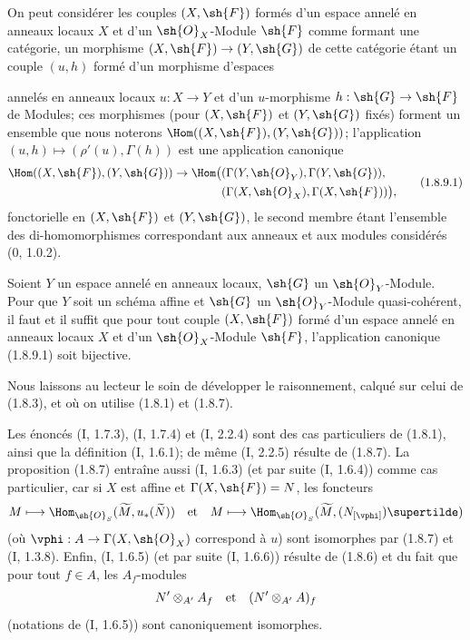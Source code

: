 \begin{env}[1.8.9]
\label{ega2:addendum:I.1.8.9-fr}
On peut considérer les couples $(X,\sh{F})$ formés d'un espace annelé
en anneaux locaux $X$ et d'un $\sh{O}_X$-Module $\sh{F}$ comme formant
une catégorie, un morphisme $(X,\sh{F})\to(Y,\sh{G})$ de cette catégorie
étant un couple $(u,h)$ formé d'un morphisme d'espaces
annelés en anneaux locaux $u:X\to Y$ et d'un $u$-morphisme
$h:\sh{G}\to\sh{F}$ de Modules; ces
morphismes (pour $(X,\sh{F})$ et $(Y,\sh{G})$ fixés) forment un ensemble
que nous noterons $\Hom((X,\sh{F}),(Y,\sh{G}))$; l'application
$(u,h)\mapsto(\rho'(u),\Gamma(h))$ est une application canonique
\begin{equation}
\label{ega2:addendum:I.1.8.9.1-fr}
\begin{split}
  \Hom((X,\sh{F}),(Y,\sh{G}))\to
  \Hom\bigl(
    &(\Gamma(Y,\sh{O}_Y),\Gamma(Y,\sh{G})),\\
    &(\Gamma(X,\sh{O}_X),\Gamma(X,\sh{F}))
  \bigr),
\end{split}
\tag{1.8.9.1}
\end{equation}
fonctorielle en $(X,\sh{F})$ et $(Y,\sh{G})$, le second membre étant
l'ensemble des di-homomorphismes correspondant aux anneaux et aux
modules considérés (0, 1.0.2).
\end{env}

\begin{corollary}[1.8.10]
\label{ega2:addendum:I.1.8.10-fr}
Soient $Y$ un espace annelé en anneaux locaux, $\sh{G}$ un
$\sh{O}_Y$-Module. Pour que $Y$ soit un schéma affine et $\sh{G}$ un
$\sh{O}_Y$-Module quasi-cohérent, il faut et il suffit que pour tout
couple $(X,\sh{F})$ formé d'un espace annelé en anneaux locaux $X$ et
d'un $\sh{O}_X$-Module $\sh{F}$, l'application canonique (1.8.9.1) soit
bijective.
\end{corollary}

Nous laissons au lecteur le soin de développer le raisonnement, calqué
sur celui de (1.8.3), et où on utilise (1.8.1) et (1.8.7).

\begin{remark}[1.8.11]
\label{ega2:addendum:I.1.8.11-fr}
Les énoncés (I, 1.7.3), (I, 1.7.4) et (I, 2.2.4) sont des cas
particuliers de (1.8.1), ainsi que la définition (I, 1.6.1); de même
(I, 2.2.5) résulte de (1.8.7). La proposition (1.8.7) entraîne aussi
(I, 1.6.3) (et par suite (I, 1.6.4)) comme cas particulier, car si $X$
est affine et $\Gamma(X,\sh{F})=N$, les foncteurs
\[
  M\longmapsto
  \Hom_{\sh{O}_S}(\widetilde M,u_*(\widetilde N))
  \quad\hbox{et}\quad
  M\longmapsto
  \Hom_{\sh{O}_S}(\widetilde M,(N_{[\vphi]})\supertilde)
\]
(où $\vphi:A\to\Gamma(X,\sh{O}_X)$ correspond à $u$) sont isomorphes
par (1.8.7) et (I, 1.3.8). Enfin, (I, 1.6.5) (et par suite (I, 1.6.6))
résulte de (1.8.6) et du fait que pour tout $f\in A$, les $A_f$-modules
\[
  N'\otimes_{A'}A_f
  \quad\hbox{et}\quad
  (N'\otimes_{A'}A)_f
\]
(notations de (I, 1.6.5)) sont canoniquement isomorphes.
\end{remark}

